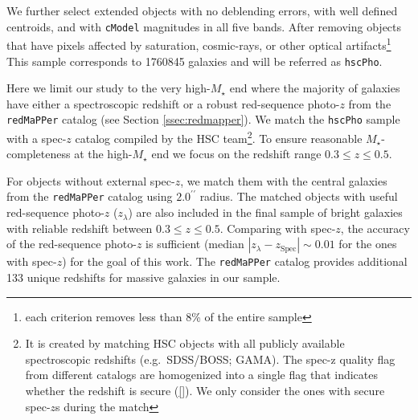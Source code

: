 \documentclass[a4paper,fleqn,usenatbib]{mnras}
\def\arcsec{{\prime\prime}}
\def\redm{\texttt{redMaPPer}}
\def\mstar{{$M_{\star}$}}
\begin{document}
    We further select extended objects with no deblending errors, with well defined 
    centroids, and with \texttt{cModel} magnitudes in all five bands. 
    After removing objects that have pixels affected by saturation, cosmic-rays, or 
    other optical artifacts\footnote{each criterion removes less than 8\% of the 
    entire sample}
    This sample corresponds to 1760845 galaxies and will be referred as \texttt{hscPho}. 
        
    Here we limit our study to the very high-\mstar{} end where the majority of galaxies 
    have either a spectroscopic redshift or a robust red-sequence photo-$z$ from the 
    \redm{} catalog (see Section \ref{ssec:redmapper}).  
    We match the \texttt{hscPho} sample with a spec-$z$ catalog compiled by the HSC 
    team\footnote{It is created by matching HSC objects with all publicly available 
    spectroscopic redshifts (e.g.\ SDSS/BOSS; GAMA). The spec-z quality flag from 
    different catalogs are homogenized into a single flag that indicates whether the 
    redshift is secure (\ref{}). 
    We only consider the ones with secure spec-$z$s during the match}.  
    To ensure reasonable \mstar{}-completeness at the high-\mstar{} end we focus on
    the redshift range $0.3 \leq z \leq 0.5$. 
   
    For objects without external spec-$z$, we match them with the central galaxies 
    from the \redm{} catalog using $2.0^{\arcsec}$ radius. 
    The matched objects with useful red-sequence photo-$z$ ($z_{\lambda}$) are also 
    included in the final sample of bright galaxies with reliable redshift between 
    $0.3 \leq z \leq 0.5$. 
    Comparing with spec-$z$, the accuracy of the red-sequence photo-$z$ is sufficient 
    (median $|z_{\lambda} - z_{\mathrm{Spec}}| \sim 0.01$ for the ones with spec-$z$) 
    for the goal of this work.
    The \redm{} catalog provides additional 133 unique redshifts for massive galaxies 
    in our sample.
        
\end{document}
